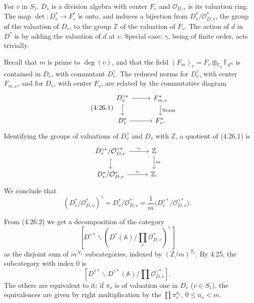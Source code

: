 \documentclass[10pt]{article}
\newcommand{\Fq}{\mathbb F_q}
\newcommand{\Fqm}{\mathbb F_{q^m}}
\newcommand{\Z}{\mathbb Z}
\newcommand{\Adele}{\mathbb A}
\newcommand{\degm}{\operatorname{deg}}
\theoremstyle{deligne}
\newcommand{\heading}[1]{\vspace{0.7em}\noindent{\bfseries #1}\quad}
\begin{document}
\heading{4.26.} For $v$ in $S_1$, $D_v$ is a division algebra with center $F_v$ and $\mathcal O_{D,v}$ is its valuation ring. The map $\det:D_v^*\to F_v^*$ is onto, and induces a bijection from $D_v^*/\mathcal O_{D,v}^*$, the group of the valuation of $D_v$, to the group $\Z$ of the valuation of $F_v$. The action of $d$ in $D^*$ is by adding the valuation of $d$ at $v$. Special case: $\gamma$, being of finite order, acts trivially.

Recall that $m$ is prime to $\degm(v)$, and that the field $(F_m)_v=F_v\otimes_{\Fq}\Fqm$ is contained in $D_v$, with commutant $D_v^\gamma$. The reduced norms for $D_v^\gamma$, with center $F_{m,v}$, and for $D_v$, with center $F_v$, are related by the commutative diagram
\begin{equation}\tag{4.26.1}
\begin{tikzcd}[column sep=2.8em,row sep=1.5em]
D_v^{\gamma *} \arrow[r] \arrow[d,hook] & F_{m,v}^* \arrow[d,"\mathrm{Norm}"]\\
D_v^* \arrow[r] & F_v^* .
\end{tikzcd}
\end{equation}
Identifying the groups of valuations of $D_v^\gamma$ and $D_v$ with $\Z$, a quotient of (4.26.1) is
\[
\begin{tikzcd}[column sep=2.8em,row sep=1.5em]
D_v^{\gamma *}/\mathcal O_{D,v}^{\gamma *} \arrow[r,"\sim"] \arrow[d,hook] & \Z \arrow[d,"m"]\\
D_v^*/\mathcal O_{D,v}^* \arrow[r,"\sim"] & \Z .
\end{tikzcd}
\]
We conclude that
\begin{equation}\tag{4.26.2}
(D_v^*/\mathcal O_{D,v}^*)^\gamma=D_v^*/\mathcal O_{D,v}^*=\frac1m\bigl(D_v^{\gamma *}/\mathcal O_{D,v}^{\gamma *}\bigr).
\end{equation}

\heading{4.27.} From (4.26.2) we get a decomposition of the category
\[
[D^{\gamma *}\backslash(D^*(\Adele)/\prod_v\mathcal O_{D,v}^*)^\gamma]
\]
as the disjoint sum of $m^{N_1}$ subcategories, indexed by $(\Z/m)^{S_1}$. By 4.25, the subcategory with index $0$ is
\[
[D^{\gamma *}\backslash D^{\gamma *}(\Adele)/\prod\mathcal O_{D,v}^{\gamma *}].
\]
The others are equivalent to it: if $\pi_v$ is of valuation one in $D_v$ ($v\in S_1$), the equivalences are given by right multiplication by the $\prod\pi_v^{a_v}$, $0\le a_v<m$.
\end{document}

